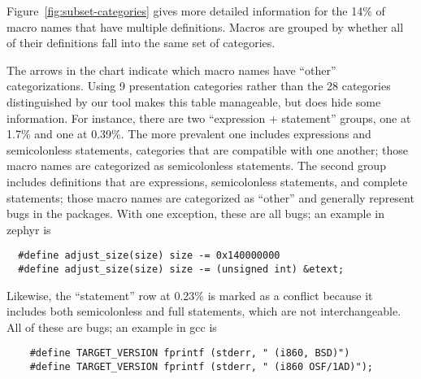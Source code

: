 \documentclass[10pt]{article}
\newcommand{\pkg}[1]{\textsf{#1}}
\begin{document}

Figure~\ref{fig:subset-categories} gives more detailed information for the
14\% of macro names that have multiple definitions.  Macros are grouped by
whether all of their definitions fall into the same set of categories.


The arrows in the chart indicate which macro names have ``other''
categorizations.  Using 9 presentation categories rather than the 28
categories distinguished by our tool makes this table manageable, but does
hide some information.  For instance, there are two ``expression +
statement'' groups, one at 1.7\% and one at 0.39\%.  The more prevalent one
includes expressions and semicolonless statements, categories that are
compatible with one another; those macro names are categorized as
semicolonless statements.  The second group includes definitions that are
expressions, semicolonless statements, and complete statements; those macro
names are categorized as ``other'' and generally represent bugs in the
packages.  With one exception, these are all bugs; an example in
\pkg{zephyr} is
\begin{verbatim}
  #define adjust_size(size) size -= 0x140000000
  #define adjust_size(size) size -= (unsigned int) &etext;
\end{verbatim}


Likewise, the ``statement'' row at 0.23\% is marked as a conflict because
it includes both semicolonless and full statements, which are not
interchangeable.  All of these are bugs; an example in \pkg{gcc} is
\begin{verbatim}
    #define TARGET_VERSION fprintf (stderr, " (i860, BSD)")
    #define TARGET_VERSION fprintf (stderr, " (i860 OSF/1AD)");
\end{verbatim}
\end{document}

